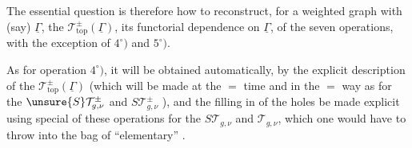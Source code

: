 The essential question is therefore how to reconstruct, for a weighted graph \deleted{$\unsure{\Gamma}$} with
  (say) $\underline\Gamma$, the
 $\mathcal T_{\mathrm{top}}^\pm(\underline\Gamma)$,
  its functorial dependence on $\underline\Gamma$,
 
of the seven operations, with the exception of $4^\circ)$ and $5^\circ)$.

As for operation $4^\circ)$, it will be obtained automatically, by the explicit description of the
$\mathcal T_{\mathrm{top}}^\pm(\underline\Gamma)$
(which will be made at the $=$ time and in the $=$ way as for the $\unsure{S}\mathcal T_{g,\nu}^\pm$ and $S\mathcal T_{g,\nu}^\pm$ ),
and the filling in of the holes  be made explicit using  special  of these operations for the
$S\mathcal T_{g,\nu}$ and $\mathcal T_{g,\nu}$, which one would have to throw into the bag of
``elementary''   .

\deleted{$(**)$}\quad
{}
